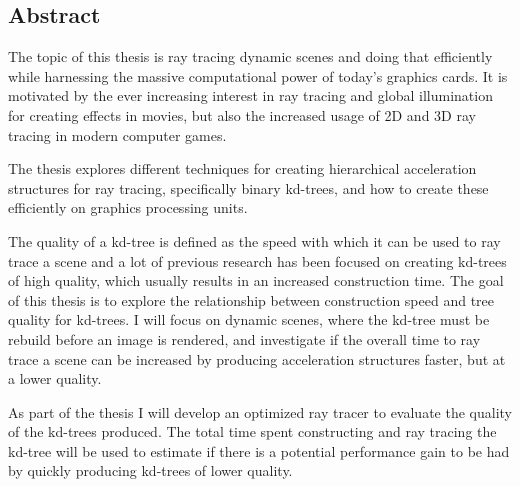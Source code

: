 
\begin{center}
\begin{minipage}{0.7\textwidth}
\vspace{6cm}

\section*{Abstract}

The topic of this thesis is ray tracing dynamic scenes and doing that
efficiently while harnessing the massive computational power of today's graphics
cards. It is motivated by the ever increasing interest in ray tracing and global
illumination for creating effects in movies, but also the increased usage of 2D
and 3D ray tracing in modern computer games.

The thesis explores different techniques for creating hierarchical acceleration
structures for ray tracing, specifically binary kd-trees, and how to create
these efficiently on graphics processing units.

The quality of a kd-tree is defined as the speed with which it can be used to
ray trace a scene and a lot of previous research has been focused on creating
kd-trees of high quality, which usually results in an increased construction
time. The goal of this thesis is to explore the relationship between
construction speed and tree quality for kd-trees. I will focus on dynamic
scenes, where the kd-tree must be rebuild before an image is rendered, and
investigate if the overall time to ray trace a scene can be increased by
producing acceleration structures faster, but at a lower quality.

As part of the thesis I will develop an optimized ray tracer to evaluate the
quality of the kd-trees produced. The total time spent constructing and ray
tracing the kd-tree will be used to estimate if there is a potential performance
gain to be had by quickly producing kd-trees of lower quality.

\end{minipage}
\end{center}


